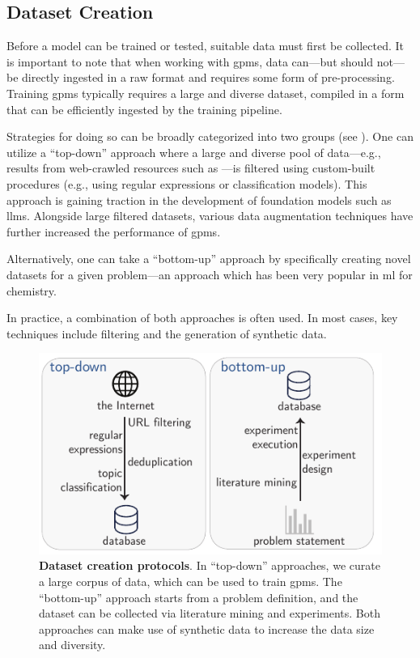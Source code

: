 \subsection{Dataset Creation}

Before a model can be trained or tested, suitable data must first be collected. 
It is important to note that when working with \glspl{gpm}, data can---but should not---be directly ingested in a raw format and requires some form of pre-processing.
Training \glspl{gpm} typically requires a large and diverse dataset, compiled in a form that can be efficiently ingested by the training pipeline.

Strategies for doing so can be broadly categorized into two groups (see  ).
One can utilize a \enquote{top-down} approach where a large and diverse pool of data---e.g., results from web-crawled resources such as \autocite{commoncrawl}---is filtered using custom-built procedures (e.g., using regular expressions or classification models). 
This approach is gaining traction in the development of foundation models such as \glspl{llm}.\autocite{penedo2023refinedweb,penedo2024fineweb,guo2025deepseek} Alongside large filtered datasets, various data augmentation techniques have further increased the performance of \glspl{gpm}.\autocite{maini2024rephrasing,pieler2024rephrasing}

Alternatively, one can take a \enquote{bottom-up} approach by specifically creating novel datasets for a given problem---an approach which has been very popular in \gls{ml} for chemistry. 

In practice, a combination of both approaches is often used. In most cases, key techniques include filtering and the generation of synthetic data.

\begin{figure}[ht]
    \centering
    \includegraphics{figures/rescaled_figures/chemrev_figure3.pdf}
    \caption{\textbf{Dataset creation protocols}. In \enquote{top-down} approaches, we curate a large corpus of data, which can be used to train \glspl{gpm}. The \enquote{bottom-up} approach starts from a problem definition, and the dataset can be collected via literature mining and experiments. Both approaches can make use of synthetic data to increase the data size and diversity.}
    \label{fig:data_protocols}
\end{figure}


